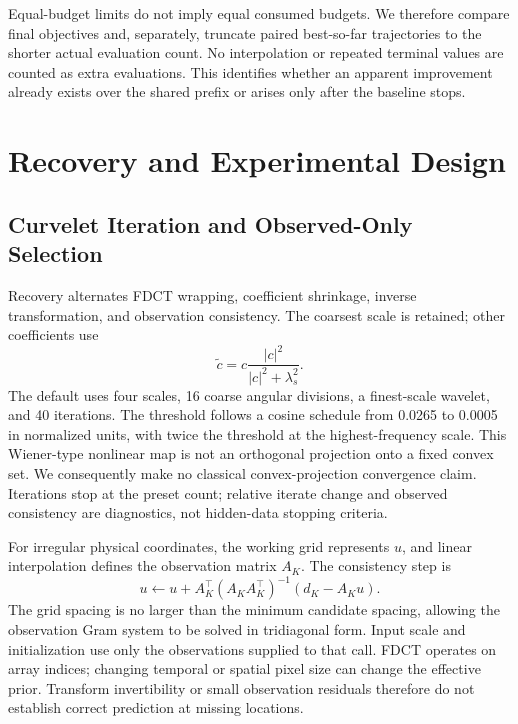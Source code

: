 \documentclass[journal]{IEEEtran}
\begin{document}
Equal-budget limits do not imply equal consumed budgets. We therefore compare final objectives and, separately, truncate paired best-so-far trajectories to the shorter actual evaluation count. No interpolation or repeated terminal values are counted as extra evaluations. This identifies whether an apparent improvement already exists over the shared prefix or arises only after the baseline stops.

\section{Recovery and Experimental Design}
\subsection{Curvelet Iteration and Observed-Only Selection}
Recovery alternates FDCT wrapping, coefficient shrinkage, inverse transformation, and observation consistency. The coarsest scale is retained; other coefficients use
\begin{equation}
\widetilde c=c\frac{|c|^2}{|c|^2+\lambda_s^2}.
\end{equation}
The default uses four scales, 16 coarse angular divisions, a finest-scale wavelet, and 40 iterations. The threshold follows a cosine schedule from 0.0265 to 0.0005 in normalized units, with twice the threshold at the highest-frequency scale. This Wiener-type nonlinear map is not an orthogonal projection onto a fixed convex set. We consequently make no classical convex-projection convergence claim. Iterations stop at the preset count; relative iterate change and observed consistency are diagnostics, not hidden-data stopping criteria.

For irregular physical coordinates, the working grid represents $u$, and linear interpolation defines the observation matrix $A_K$. The consistency step is
\begin{equation}
u\leftarrow u+A_K^\top(A_KA_K^\top)^{-1}(d_K-A_Ku).
\label{eq:projection}
\end{equation}
The grid spacing is no larger than the minimum candidate spacing, allowing the observation Gram system to be solved in tridiagonal form. Input scale and initialization use only the observations supplied to that call. FDCT operates on array indices; changing temporal or spatial pixel size can change the effective prior. Transform invertibility or small observation residuals therefore do not establish correct prediction at missing locations.
\end{document}
